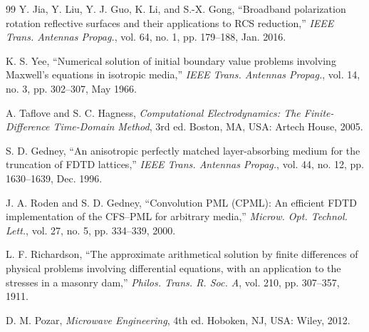 \documentclass[journal]{IEEEtran}
\begin{document}
\begin{thebibliography}{99}
 Y. Jia, Y. Liu, Y. J. Guo, K. Li, and S.-X. Gong, ``Broadband polarization rotation reflective surfaces and their applications to RCS reduction,'' \textit{IEEE Trans. Antennas Propag.}, vol. 64, no. 1, pp. 179--188, Jan. 2016.

 K. S. Yee, ``Numerical solution of initial boundary value problems involving Maxwell's equations in isotropic media,'' \textit{IEEE Trans. Antennas Propag.}, vol. 14, no. 3, pp. 302--307, May 1966.

 A. Taflove and S. C. Hagness, \textit{Computational Electrodynamics: The Finite-Difference Time-Domain Method}, 3rd ed. Boston, MA, USA: Artech House, 2005.

 S. D. Gedney, ``An anisotropic perfectly matched layer-absorbing medium for the truncation of FDTD lattices,'' \textit{IEEE Trans. Antennas Propag.}, vol. 44, no. 12, pp. 1630--1639, Dec. 1996.

 J. A. Roden and S. D. Gedney, ``Convolution PML (CPML): An efficient FDTD implementation of the CFS--PML for arbitrary media,'' \textit{Microw. Opt. Technol. Lett.}, vol. 27, no. 5, pp. 334--339, 2000.

 L. F. Richardson, ``The approximate arithmetical solution by finite differences of physical problems involving differential equations, with an application to the stresses in a masonry dam,'' \textit{Philos. Trans. R. Soc. A}, vol. 210, pp. 307--357, 1911.

 D. M. Pozar, \textit{Microwave Engineering}, 4th ed. Hoboken, NJ, USA: Wiley, 2012.

\end{thebibliography}
\end{document}
